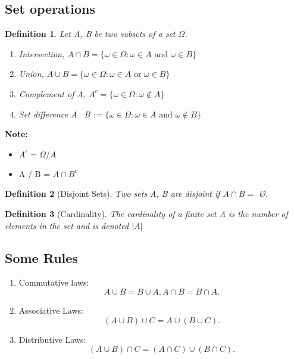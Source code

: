 \documentclass[a4paper]{article}
\numberwithin{counter}{subsection}
\theoremstyle{break}
\newtheorem{definition}{Definition}
\begin{document}
			\subsection{Set operations}%
			
				\begin{definition}
					Let A, B be two subsets of a set $\Omega$.
					\begin{enumerate}
						\item Intersection, $A \cap B = \{\omega \in \Omega : \omega \in A \text{ and } \omega \in B \} $
						\item Union, $A \cup B = \{\omega \in \Omega: \omega \in A \text{ or } \omega \in B\}$ 
						\item Complement of A, $A^{c} = \{\omega \in \Omega: \omega \not\in A\}$
						\item Set difference A \ B := $\{\omega \in \Omega: \omega \in A \text{ and } \omega \not\in B \} $
					\end{enumerate}
				\end{definition}

				\textbf{Note:} 
				\begin{itemize}
					\item $A^{c} = \Omega / A$
						\item A / B = $A \cap B^{c}$
				\end{itemize}

				\begin{definition}[Disjoint Sets]
					Two sets A, B are disjoint if $A \cap B =$ \O.
				\end{definition}

				\begin{definition}[Cardinality]
					The cardinality of a finite set A is the number of elements in the set and is denoted $| A |$
				\end{definition}
			\subsection{Some Rules}%
				\begin{enumerate}
					\item Commutative laws: \[
					A \cup B = B \cup A, A \cap B = B \cap A
					.\] 

					\item Associative Laws: \[
							(A \cup B) \cup C = A \cup (B \cup C)
					.\] 

					\item Distributive Laws: \[
							(A \cup B) \cap C = (A \cap C) \cup (B \cap C)
					.\] 
				\end{enumerate}
\end{document}
